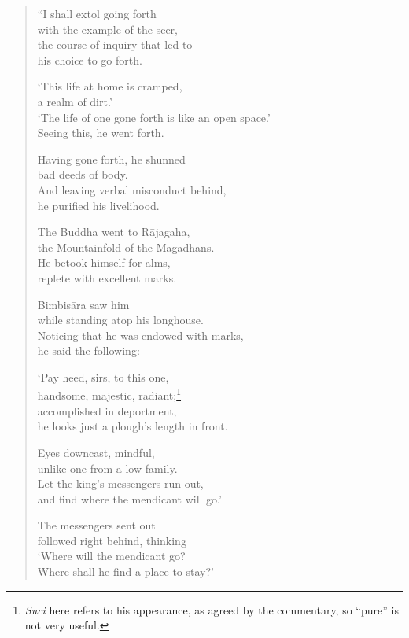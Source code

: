 \documentclass[12pt,openany]{book}%
\begin{document}
\begin{verse}%
“I shall extol going forth \\
with the example of the seer, \\
the course of inquiry that led to \\
his choice to go forth. 

‘This life at home is cramped, \\
a realm of dirt.’ \\
‘The life of one gone forth is like an open space.’ \\
Seeing this, he went forth. 

Having gone forth, he shunned \\
bad deeds of body. \\
And leaving verbal misconduct behind, \\
he purified his livelihood. 

The Buddha went to \textsanskrit{Rājagaha}, \\
the Mountainfold of the Magadhans. \\
He betook himself for alms, \\
replete with excellent marks. 

\textsanskrit{Bimbisāra} saw him \\
while standing atop his longhouse. \\
Noticing that he was endowed with marks, \\
he said the following: 

‘Pay heed, sirs, to this one, \\
handsome, majestic, radiant;\footnote{\textit{Suci} here refers to his appearance, as agreed by the commentary, so “pure” is not very useful. } \\
accomplished in deportment, \\
he looks just a plough’s length in front. 

Eyes downcast, mindful, \\
unlike one from a low family. \\
Let the king’s messengers run out, \\
and find where the mendicant will go.’ 

The messengers sent out \\
followed right behind, thinking \\
‘Where will the mendicant go? \\
Where shall he find a place to stay?’ 


\end{verse}
\end{document}
